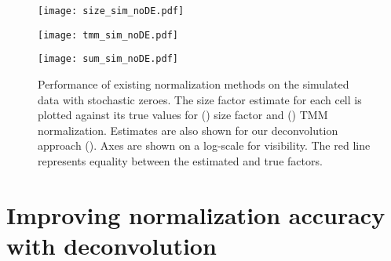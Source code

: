 \documentclass{article}
\begin{document}
\begin{figure}[tb]
\begin{minipage}{0.33\textwidth}
\texttt{[image: size\_sim\_noDE.pdf]}
\subcaption{}\label{subfig:size_noDE}
\end{minipage}
\begin{minipage}{0.33\textwidth}
\texttt{[image: tmm\_sim\_noDE.pdf]}
\subcaption{}\label{subfig:tmm_noDE}
\end{minipage}
\begin{minipage}{0.33\textwidth}
\texttt{[image: sum\_sim\_noDE.pdf]}
\subcaption{}\label{subfig:sum_noDE}
\end{minipage}
\caption{
    Performance of existing normalization methods on the simulated data with stochastic zeroes.
    The size factor estimate for each cell is plotted against its true values for () size factor and () TMM normalization.
    Estimates are also shown for our deconvolution approach ().
    Axes are shown on a log-scale for visibility.
    The red line represents equality between the estimated and true factors.
}
\label{fig:sim_noDE}
\end{figure}

\section{Improving normalization accuracy with deconvolution}
\end{document}
